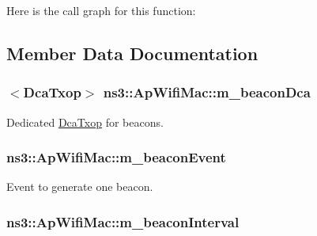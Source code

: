 Here is the call graph for this function\+:




\subsection{Member Data Documentation}
\subsubsection[{\texorpdfstring{m\+\_\+beacon\+Dca}{m_beaconDca}}]{$<${\bf Dca\+Txop}$>$ ns3\+::\+Ap\+Wifi\+Mac\+::m\+\_\+beacon\+Dca\hspace{0.3cm}{\ttfamily [private]}}\hypertarget{classns3_1_1ApWifiMac_a5eb69e654f0897d16c71e96bf168784d}{}\label{classns3_1_1ApWifiMac_a5eb69e654f0897d16c71e96bf168784d}


Dedicated \hyperlink{classns3_1_1DcaTxop}{Dca\+Txop} for beacons. 

\subsubsection[{\texorpdfstring{m\+\_\+beacon\+Event}{m_beaconEvent}}]{ ns3\+::\+Ap\+Wifi\+Mac\+::m\+\_\+beacon\+Event\hspace{0.3cm}{\ttfamily [private]}}\hypertarget{classns3_1_1ApWifiMac_a9ba5983f49f1c44c2623ace4e463d3a0}{}\label{classns3_1_1ApWifiMac_a9ba5983f49f1c44c2623ace4e463d3a0}


Event to generate one beacon. 

\subsubsection[{\texorpdfstring{m\+\_\+beacon\+Interval}{m_beaconInterval}}]{ ns3\+::\+Ap\+Wifi\+Mac\+::m\+\_\+beacon\+Interval\hspace{0.3cm}{\ttfamily [private]}}\hypertarget{classns3_1_1ApWifiMac_a798e9c63c2c85d0973fd1456ffdd38e3}{}\label{classns3_1_1ApWifiMac_a798e9c63c2c85d0973fd1456ffdd38e3}


